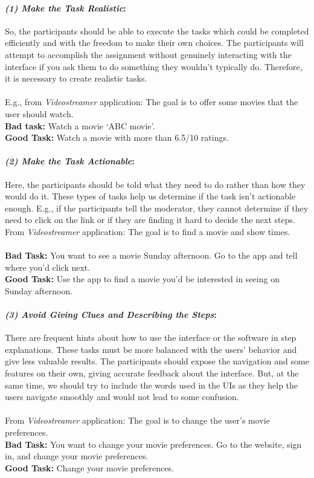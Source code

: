 \paragraph{\textit{(1) Make the Task Realistic}:}
So, the participants should be able to execute the tasks which could be completed efficiently and with the freedom to make their own choices.
The participants will attempt to accomplish the assignment without genuinely interacting with the interface if you ask them to do something they wouldn't typically do. 
Therefore, it is necessary to create realistic tasks. \\\\
E.g., from \textit{Videostreamer} application: The goal is to offer some movies that the user should watch. \\
\textbf{Bad task: } Watch a movie `ABC movie'.\\
\textbf{Good Task: } Watch a movie with more than 6.5/10 ratings. \\

\paragraph{\textit{(2) Make the Task Actionable}:}
Here, the participants should be told what they need to do rather than how they would do it.
These types of tasks help us determine if the task isn’t actionable enough. 
E.g., if the participants tell the moderator, they cannot determine if they need to click on the link or if they are finding it hard to decide the next steps. \\
From \textit{Videostreamer} application: The goal is to find a movie and show times. \\\\
\textbf{Bad Task: } You want to see a movie Sunday afternoon. Go to the app and tell where you’d click next. \\
\textbf{Good Task: } Use the app to find a movie you’d be interested in seeing on Sunday afternoon. \\

\paragraph{\textit{(3) Avoid Giving Clues and Describing the Steps}:}
There are frequent hints about how to use the interface or the software in step explanations.
These tasks must be more balanced with the users' behavior and give less valuable results.   
The participants should expose the navigation and some features on their own, giving accurate feedback about the interface.
But, at the same time, we should try to include the words used in the UIs as they help the users navigate smoothly and would not lead to some confusion. \\\\
From \textit{Videostreamer} application: The goal is to change the user's movie preferences. \\
\textbf{Bad Task: } You want to change your movie preferences. Go to the website, sign in, and change your movie preferences. \\
\textbf{Good Task: } Change your movie preferences.


